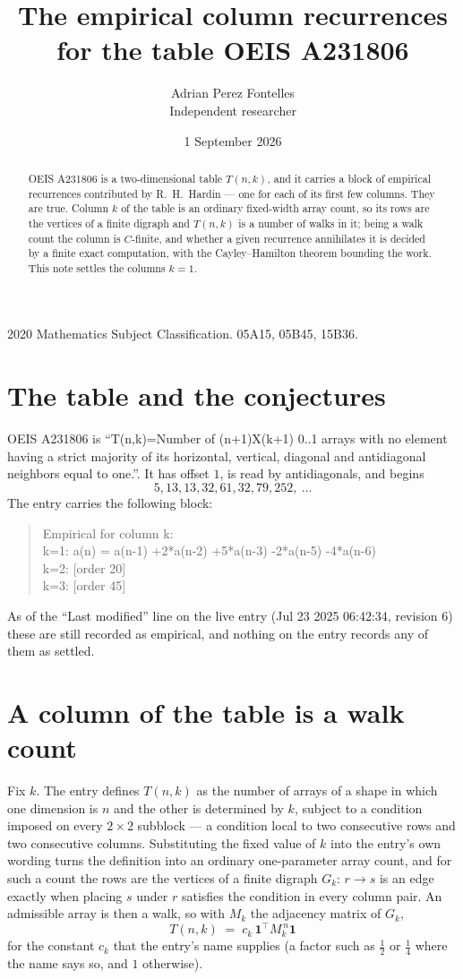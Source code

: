 \documentclass[11pt,a4paper]{article}
\title{The empirical column recurrences for the table OEIS A231806}
\author{Adrian Perez Fontelles\\ \small Independent researcher}
\date{1 September 2026}
\theoremstyle{plain}
\theoremstyle{definition}
\begin{document}
\maketitle

\begin{abstract}
OEIS A231806 is a two-dimensional table $T(n,k)$, and it carries a block of empirical
recurrences contributed by R.~H.~Hardin --- one for each of its first few columns. They are
true. Column $k$ of the table is an ordinary fixed-width array count, so its rows are the
vertices of a finite digraph and $T(n,k)$ is a number of walks in it; being a walk count the
column is $C$-finite, and whether a given recurrence annihilates it is decided by a finite
exact computation, with the Cayley--Hamilton theorem bounding the work. This note settles the columns $k=1$.
\end{abstract}

\noindent\small 2020 Mathematics Subject Classification. 05A15, 05B45, 15B36.\normalsize

\section{The table and the conjectures}

OEIS A231806 is ``T(n,k)=Number of (n+1)X(k+1) 0..1 arrays with no element having a strict majority of its horizontal, vertical, diagonal and antidiagonal neighbors equal to one.''. It has offset $1$, is
read by antidiagonals, and begins
\[
5, 13, 13, 32, 61, 32, 79, 252,\ \dots
\]
The entry carries the following block:
\begin{quote}\small
Empirical for column k:\\
k=1: a(n) = a(n-1) +2*a(n-2) +5*a(n-3) -2*a(n-5) -4*a(n-6)\\
k=2: [order 20]\\
k=3: [order 45]\\
\end{quote}
As of the ``Last modified'' line on the live entry (Jul 23 2025 06:42:34, revision 6) these are still
recorded as empirical, and nothing on the entry records any of them as settled.

\section{A column of the table is a walk count}

Fix $k$. The entry defines $T(n,k)$ as the number of arrays of a shape in which one dimension
is $n$ and the other is determined by $k$, subject to a condition imposed on every
$2\times2$ subblock --- a condition local to two consecutive rows and two consecutive columns.
Substituting the fixed value of $k$ into the entry's own wording turns the definition into an
ordinary one-parameter array count, and for such a count the rows are the vertices of a finite
digraph $G_k$: $r\to s$ is an edge exactly when placing $s$ under $r$ satisfies the condition
in every column pair. An admissible array is then a walk, so with $M_k$ the adjacency matrix
of $G_k$,
\[
T(n,k)\;=\;c_k\,\mathbf{1}^{\!\top}M_k^{\,n}\mathbf{1}
\]
for the constant $c_k$ that the entry's name supplies (a factor such as $\tfrac12$ or
$\tfrac14$ where the name says so, and $1$ otherwise).
\end{document}
